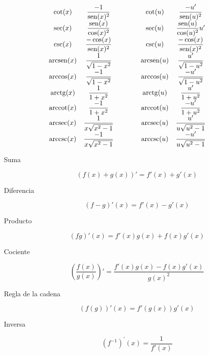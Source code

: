 \begin{tcolorbox}[hbox, title=Derivadas básicas]
\begin{minipage}{0.7\textwidth}
\[\begin{array}{ccccc}
  \cot(x)      & \dfrac{-1}{\operatorname{sen}(x)^2}         & \qquad & \cot(u)      & \dfrac{-u'}{\operatorname{sen}(u)^2}\\
  \sec(x)      & \dfrac{\operatorname{sen}(x)}{\cos(x)^2}    & \qquad & \sec(u)      & \dfrac{\operatorname{sen}(u)}{\cos(u)^2}u'\\
  \csc(x)      & \dfrac{-\cos(x)}{\operatorname{sen}(x)^2}   & \qquad & \csc(u)      & \dfrac{-\cos(x)}{\operatorname{sen}(x)^2}\\
  \operatorname{arcsen}(x)   & \dfrac{1}{\sqrt{1-x^2}}       & \qquad & \operatorname{arcsen}(u)   & \dfrac{u'}{\sqrt{1-u^2}}\\
  \arccos(x)   & \dfrac{-1}{\sqrt{1-x^2}}      & \qquad & \arccos(u)   & \dfrac{-u'}{\sqrt{1-u^2}}\\
  \operatorname{arctg}(x)    & \dfrac{1}{1+x^2}              & \qquad & \operatorname{arctg}(u)    & \dfrac{u'}{1+u^2}\\
  \operatorname{arccot}(x)   & \dfrac{-1}{1+x^2}             & \qquad & \operatorname{arccot}(u)   & \dfrac{-u'}{1+u^2}\\
  \operatorname{arcsec}(x)   & \dfrac{1}{x\sqrt{x^2-1}}      & \qquad & \operatorname{arcsec}(u)   & \dfrac{u'}{u\sqrt{u^2-1}}\\
  \operatorname{arccsc}(x)   & \dfrac{-1}{x\sqrt{x^2-1}}     & \qquad & \operatorname{arccsc}(u)   & \dfrac{-u'}{u\sqrt{u^2-1}}  
\end{array}
\]
\end{minipage}
\end{tcolorbox}

\begin{tcolorbox}[hbox, title=Reglas de derivación]
  \begin{minipage}{0.5\textwidth}
    \begin{description}
      \item[Suma]
      \[
        (f(x)+g(x))' = f'(x) + g'(x)
      \]
      \item[Diferencia]
      \[
        (f-g)'(x) = f'(x) - g'(x)
      \]
      \item[Producto]
      \[
        (fg)'(x) = f'(x)g(x) + f(x)g'(x)
      \]
      \item[Cociente]
      \[
        \left(\frac{f(x)}{g(x)}\right)' = \frac{f'(x)g(x) - f(x)g'(x)}{g(x)^2}
      \]
      \item[Regla de la cadena]
      \[
        (f(g))'(x) = f'(g(x))g'(x)
      \]
      \item[Inversa]
      \[
        (f^{-1})^\prime(x) = \frac{1}{f'(x)}
      \]
    \end{description}
  \end{minipage}
\end{tcolorbox}